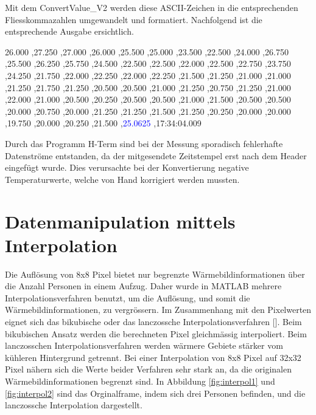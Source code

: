 Mit dem ConvertValue\_V2 werden diese \ac{ASCII}-Zeichen in die entsprechenden Fliesskommazahlen umgewandelt und formatiert. Nachfolgend ist die entsprechende Ausgabe ersichtlich.

26.000 ,27.250 ,27.000 ,26.000 ,25.500 ,25.000 ,23.500 ,22.500 ,24.000 ,26.750 ,25.500 ,26.250 ,25.750 ,24.500 ,22.500 ,22.500 ,22.000 ,22.500 ,22.750 ,23.750 ,24.250 ,21.750 ,22.000 ,22.250 ,22.000 ,22.250 ,21.500 ,21.250 ,21.000 ,21.000 ,21.250 ,21.750 ,21.250 ,20.500 ,20.500 ,21.000 ,21.250 ,20.750 ,21.250 ,21.000 ,22.000 ,21.000 ,20.500 ,20.250 ,20.500 ,20.500 ,21.000 ,21.500 ,20.500 ,20.500 ,20.000 ,20.750 ,20.000 ,21.250 ,21.250 ,21.500 ,21.250 ,20.250 ,20.000 ,20.000 ,19.750 ,20.000 ,20.250 ,21.500 ,\textcolor{blue}{25.0625} ,17:34:04.009

Durch das Programm H-Term sind bei der Messung sporadisch fehlerhafte Datenströme entstanden, da der mitgesendete Zeitstempel erst nach dem Header eingefügt wurde. Dies verursachte bei der Konvertierung negative Temperaturwerte, welche von Hand korrigiert werden mussten. 


\section{Datenmanipulation mittels Interpolation}
\label{sec:Datenmanipulation}

Die Auflösung von 8x8 Pixel bietet nur begrenzte Wärmebildinformationen über die Anzahl Personen in einem Aufzug. Daher wurde in MATLAB mehrere Interpolationsverfahren benutzt, um die Auflösung, und somit die Wärmebildinformationen, zu vergrössern. Im Zusammenhang mit den Pixelwerten eignet sich das bikubische oder das lanczossche Interpolationsverfahren [\protect\cite{Interpol}]. Beim bikubischen Ansatz werden die berechneten Pixel gleichmässig interpoliert. Beim lanczosschen Interpolationsverfahren werden wärmere Gebiete stärker vom kühleren Hintergrund getrennt. Bei einer Interpolation von 8x8 Pixel auf 32x32 Pixel nähern sich die Werte beider Verfahren sehr stark an, da die originalen Wärmebildinformationen begrenzt sind. In Abbildung \ref{fig:interpol1} und \ref{fig:interpol2} sind das Orginalframe, indem sich drei Personen befinden, und die lanczossche Interpolation dargestellt.


